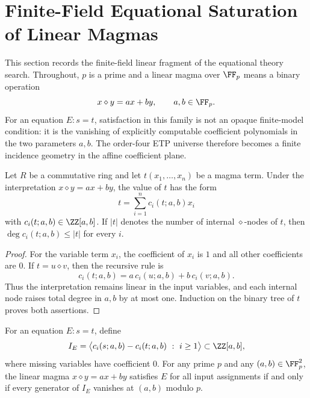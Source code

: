 \section{Finite-Field Equational Saturation of Linear Magmas}\label{sec:finite-field-equational-saturation}

This section records the finite-field linear fragment of the equational theory
search.  Throughout, \(p\) is a prime and a linear magma over \(\FF_p\) means a
binary operation
\[
    x\diamond y=ax+by,\qquad a,b\in\FF_p.
\]
For an equation \(E:s=t\), satisfaction in this family is not an opaque
finite-model condition: it is the vanishing of explicitly computable
coefficient polynomials in the two parameters \(a,b\).  The order-four ETP
universe therefore becomes a finite incidence geometry in the affine
coefficient plane.

\begin{theorem}\label{thm:finite-field-linearization}
Let \(R\) be a commutative ring and let \(t(x_1,\ldots,x_n)\) be a magma term.
Under the interpretation \(x\diamond y=ax+by\), the value of \(t\) has the form
\[
    t=\sum_{i=1}^n c_i(t;a,b)x_i
\]
with \(c_i(t;a,b)\in\ZZ[a,b]\).  If \(|t|\) denotes the number of internal
\(\diamond\)-nodes of \(t\), then \(\deg c_i(t;a,b)\leq |t|\) for every \(i\).
\end{theorem}

\begin{proof}
For the variable term \(x_i\), the coefficient of \(x_i\) is \(1\) and all
other coefficients are \(0\).  If \(t=u\diamond v\), then the recursive rule is
\[
    c_i(t;a,b)=a\,c_i(u;a,b)+b\,c_i(v;a,b).
\]
Thus the interpretation remains linear in the input variables, and each
internal node raises total degree in \(a,b\) by at most one.  Induction on the
binary tree of \(t\) proves both assertions.
\end{proof}

\begin{corollary}\label{cor:finite-field-coefficient-ideal}
For an equation \(E:s=t\), define
\[
    I_E=\bigl\langle c_i(s;a,b)-c_i(t;a,b)\ :\ i\geq 1\bigr\rangle
        \subset \ZZ[a,b],
\]
where missing variables have coefficient \(0\).  For any prime \(p\) and any
\((a,b)\in\FF_p^2\), the linear magma \(x\diamond y=ax+by\) satisfies \(E\) for
all input assignments if and only if every generator of \(I_E\) vanishes at
\((a,b)\) modulo \(p\).
\end{corollary}

